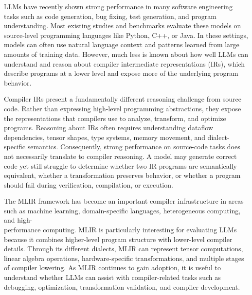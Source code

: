 \documentclass[sigplan,screen,review,anonymous]{acmart}
\begin{document}

LLMs have recently shown strong performance in many software engineering tasks such as code generation, bug fixing, test generation, and program understanding. Most existing studies and benchmarks evaluate these models on source-level programming languages like Python, C++, or Java. In these settings, models can often use natural language context and patterns learned from large amounts of training data. However, much less is known about how well LLMs can understand and reason about compiler intermediate representations (IRs), which describe programs at a lower level and expose more of the underlying program behavior.

Compiler IRs present a fundamentally different reasoning challenge from source code. Rather than expressing high-level programming abstractions, they expose the representations that compilers use to analyze, transform, and optimize programs. Reasoning about IRs often requires understanding dataflow dependencies, tensor shapes, type systems, memory movement, and dialect-specific semantics. Consequently, strong performance on source-code tasks does not necessarily translate to compiler reasoning. A model may generate correct code yet still struggle to determine whether two IR programs are semantically equivalent, whether a transformation preserves behavior, or whether a program should fail during verification, compilation, or execution.

The MLIR framework has become an important compiler infrastructure in areas such as machine learning, domain-specific languages, heterogeneous computing, and high-\\performance computing. MLIR is particularly interesting for evaluating LLMs because it combines higher-level program structure with lower-level compiler details. Through its different dialects, MLIR can represent tensor computations, linear algebra operations, hardware-specific transformations, and multiple stages of compiler lowering. As MLIR continues to gain adoption, it is useful to understand whether LLMs can assist with compiler-related tasks such as debugging, optimization, transformation validation, and compiler development.
\end{document}

